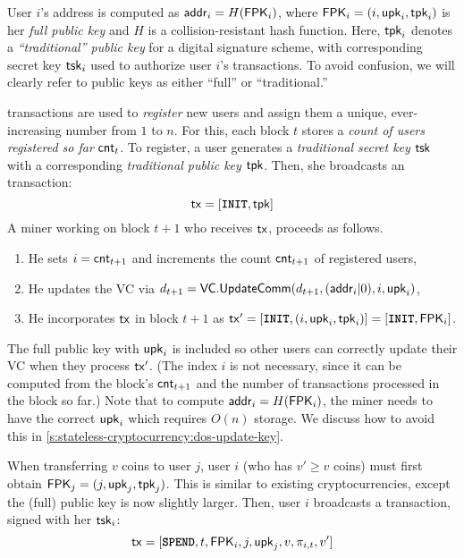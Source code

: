 User $i$'s address is computed as $\mathsf{addr}_i=H(\mathbf{\mathsf{FPK}}_i)$, where $\mathbf{\mathsf{FPK}}_i=(i,\mathsf{upk}_i,\mathsf{tpk}_i)$ is her \textit{full public key}\ifNotCameraReady\xspace and $H$ is a collision-resistant hash function\fi.
Here, $\mathsf{tpk}_i$ denotes a \textit{``traditional'' public key} for a digital signature scheme, with corresponding secret key $\mathsf{tsk}_i$ used to authorize user $i$'s transactions.
To avoid confusion, we will clearly refer to public keys as either ``full'' or ``traditional.''

\inittxn transactions are used to \textit{register} new users and assign them a unique, ever-increasing number from $1$ to $n$.
For this, each block $t$ stores a \textit{count of users registered so far} $\mathsf{cnt}_t$.
To register, a user generates a \textit{traditional secret key} $\mathsf{tsk}$ with a corresponding \textit{traditional public key} $\mathsf{tpk}$.
Then, she broadcasts an \inittxn transaction:
$$\mathsf{tx}=[\texttt{\textbf{INIT}}, \mathsf{tpk}]$$
A miner working on block ${t+1}$ who receives $\mathsf{tx}$, proceeds as follows.
\begin{enumerate}
\item He sets $i=\mathsf{cnt}_{t+1}$ and increments the count $\mathsf{cnt}_{t+1}$ of registered users,
\item He updates the VC via $d_{t+1}=\mathsf{VC}.\mathsf{UpdateComm}(d_{t+1}, (\mathsf{addr}_i\vert 0), i, \mathsf{upk}_i)$,
\item He incorporates $\mathsf{tx}$ in block $t+1$ as $\mathsf{tx}' = [\texttt{\textbf{INIT}}, (i, \mathsf{upk}_i,\mathsf{tpk}_i)]=[\texttt{\textbf{INIT}}, \mathbf{\mathsf{FPK}}_i]$.
\end{enumerate}
The full public key with $\mathsf{upk}_i$ is included so other users can correctly update their VC when they process $\mathsf{tx}'$.
\ifNotCameraReady
(The index $i$ is not necessary, since it can be computed from the block's $\mathsf{cnt}_{t+1}$ and the number of \inittxn transactions processed in the block so far.)
\fi
Note that to compute $\mathsf{addr}_i=H(\mathbf{\mathsf{FPK}}_i)$, the miner needs to have the correct $\mathsf{upk}_i$ which requires $O(n)$ storage.
We discuss how to avoid this in \cref{s:stateless-cryptocurrency:dos-update-key}.

When transferring $v$ coins to user $j$, user $i$ (who has $v'\ge v$ coins) must first obtain $\mathbf{\mathsf{FPK}}_j=(j, \mathsf{upk}_j,\mathsf{tpk}_j)$.
This is similar to existing cryptocurrencies, except the (full) public key is now slightly larger.
Then, user $i$ broadcasts a \spendtxn transaction, signed with her $\mathsf{tsk}_i$:
$$\mathsf{tx}=[\texttt{\textbf{SPEND}}, t, \mathbf{\mathsf{FPK}}_i, j, \mathsf{upk}_j, v,\pi_{i,t}, v']$$

